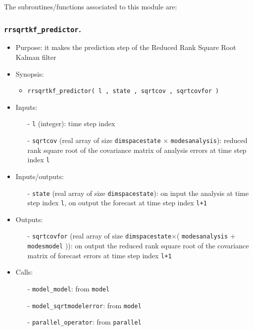 \documentclass[12pt]{article}
\begin{document}
The subroutines/functions associated to this module are:

\subsubsection{{\tt rrsqrtkf\_predictor}.} 
\begin{itemize}
\item Purpose: it makes the prediction step of the Reduced Rank Square Root Kalman filter
\item Synopsis: 
\begin{itemize}
\item {\tt rrsqrtkf\_predictor( l , state , sqrtcov , sqrtcovfor )} 
\end{itemize}
\item Inputs: 
\begin{itemize}
\item[-] {\tt l} (integer): time step index
\item[-] {\tt sqrtcov} (real array of size {\tt dimspacestate} $\times$ {\tt modesanalysis}): reduced rank square root of the covariance matrix of analysis errors at time step index {\tt l}
\end{itemize}
\item Inputs/outputs: 
\begin{itemize}
\item[-] {\tt state} (real array of size {\tt dimspacestate}): on input the analysis at time step index {\tt l}, on output the forecast at time step index {\tt l+1}
\end{itemize}
\item Outputs: 
\begin{itemize}
\item[-] {\tt sqrtcovfor} (real array of size {\tt dimspacestate}$\times$( {\tt modesanalysis} + {\tt modesmodel} )): on output the reduced rank square root of the covariance matrix of forecast errors at time step index {\tt l+1}
\end{itemize}
\item Calls: 
\begin{itemize}
\item[-] {\tt model\_model}: from {\tt model}
\item[-] {\tt model\_sqrtmodelerror}: from {\tt model}
\item[-] {\tt parallel\_operator}: from {\tt parallel}
\end{itemize}
\end{itemize} 
\end{document}
